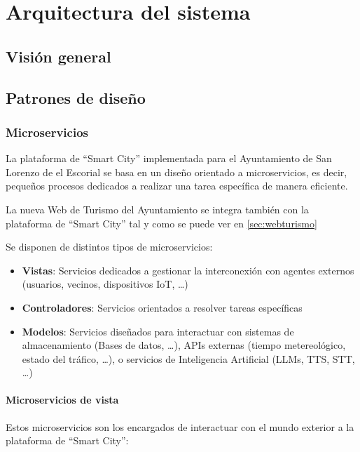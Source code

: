 \chapter{Arquitectura del sistema}
\label{cap:arquitectura}


\section{Visión general}

\section{Patrones de diseño}\label{sec:patrones}
\subsection{Microservicios}\label{sec:microservicios}

La plataforma de ``Smart City'' implementada para el Ayuntamiento de San Lorenzo de el Escorial se basa en un diseño orientado a microservicios, es decir, pequeños procesos dedicados a realizar una tarea específica de manera eficiente.

La nueva Web de Turismo del Ayuntamiento se integra también con la plataforma de ``Smart City'' tal y como se puede ver en \ref{sec:webturismo}

Se disponen de distintos tipos de microservicios:

\begin{itemize}
	\item \textbf{Vistas}: Servicios dedicados a gestionar la interconexión con agentes externos (usuarios, vecinos, dispositivos IoT, \ldots)
	\item \textbf{Controladores}: Servicios orientados a resolver tareas específicas
	\item \textbf{Modelos}: Servicios diseñados para interactuar con sistemas de almacenamiento (Bases de datos, \ldots), APIs externas (tiempo metereológico, estado del tráfico, \ldots), o servicios de Inteligencia Artificial (LLMs, TTS, STT, \ldots)
\end{itemize}

\subsubsection{Microservicios de vista}

Estos microservicios son los encargados de interactuar con el mundo exterior a la plataforma de ``Smart City'':

